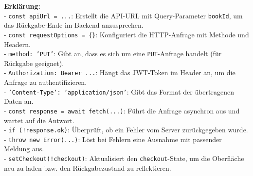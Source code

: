 \noindent \textbf{Erklärung:} \\
- \texttt{const apiUrl = ...}: Erstellt die API-URL mit Query-Parameter \texttt{bookId}, um das Rückgabe-Ende im Backend anzusprechen.\\
- \texttt{const requestOptions = \{\}}: Konfiguriert die HTTP-Anfrage mit Methode und Headern.\\
- \texttt{method: 'PUT'}: Gibt an, dass es sich um eine \texttt{PUT}-Anfrage handelt (für Rückgabe geeignet).\\
- \texttt{Authorization: \texttt{Bearer ...}}: Hängt das JWT-Token im Header an, um die Anfrage zu authentifizieren.\\
- \texttt{'Content-Type': 'application/json'}: Gibt das Format der übertragenen Daten an.\\
- \texttt{const response = await fetch(...)}: Führt die Anfrage asynchron aus und wartet auf die Antwort.\\
- \texttt{if (!response.ok)}: Überprüft, ob ein Fehler vom Server zurückgegeben wurde.\\
- \texttt{throw new Error(...)}: Löst bei Fehlern eine Ausnahme mit passender Meldung aus.\\
- \texttt{setCheckout(!checkout)}: Aktualisiert den \texttt{checkout}-State, um die Oberfläche neu zu laden bzw. den Rückgabezustand zu reflektieren.
